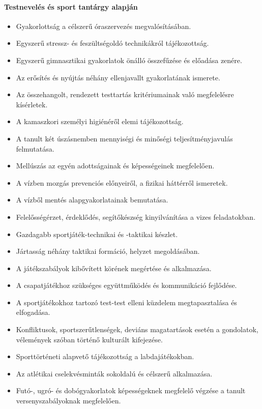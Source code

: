 \paragraph{Testnevelés és sport tantárgy alapján}
\begin{itemize}
\item Gyakorlottság a célszerű óraszervezés megvalósításában.
\item Egyszerű stressz- és feszültségoldó technikákról tájékozottság.
\item Egyszerű gimnasztikai gyakorlatok önálló összefűzése és előadása zenére.
\item Az erősítés és nyújtás néhány ellenjavallt gyakorlatának ismerete.
\item Az összehangolt, rendezett testtartás kritériumainak való megfelelésre kísérletek.
\item A kamaszkori személyi higiénéről elemi tájékozottság.
\item A tanult két úszásnemben mennyiségi és minőségi teljesítményjavulás felmutatása.
\item Mellúszás az egyén adottságainak és képességeinek megfelelően.
\item A vízben mozgás prevenciós előnyeiről, a fizikai háttérről ismeretek.
\item A vízből mentés alapgyakorlatainak bemutatása.
\item Felelősségérzet, érdeklődés, segítőkészség kinyilvánítása a vizes feladatokban.
\item Gazdagabb sportjáték-technikai és -taktikai készlet.
\item Jártasság néhány taktikai formáció, helyzet megoldásában.
\item A játékszabályok kibővített körének megértése és alkalmazása.
\item A csapatjátékhoz szükséges együttműködés és kommunikáció fejlődése.
\item A sportjátékokhoz tartozó test-test elleni küzdelem megtapasztalása és elfogadása.
\item Konfliktusok, sportszerűtlenségek, deviáns magatartások esetén a gondolatok, vélemények szóban történő kulturált kifejezése.
\item Sporttörténeti alapvető tájékozottság a labdajátékokban.
\item Az atlétikai cselekvésminták sokoldalú és célszerű alkalmazása.
\item Futó-, ugró- és dobógyakorlatok képességeknek megfelelő végzése a tanult versenyszabályoknak megfelelően.

\end{itemize}
